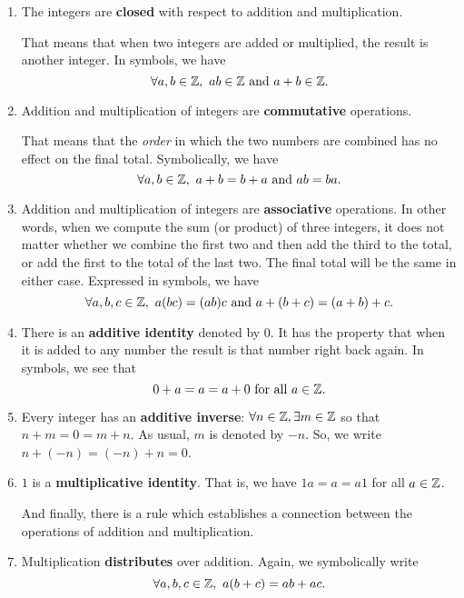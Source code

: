 \clearpage
\begin{enumerate}
 \item The integers are {\bfseries closed} with respect to addition and multiplication.
 
 That means that when two integers are added or multiplied, the result is another
 integer. In symbols, we have 
 \[
 \forall a,b\in \mathbb{Z},\ ab\in \mathbb{Z} \text{ and } a+b\in \mathbb{Z}.
 \]
 
 
 \item Addition and multiplication of integers are {\bfseries commutative} 
 operations.
 
 That means that the {\it order} in which the two numbers are combined has no
 effect on the final total. Symbolically, we have
 \[
 \forall a,b\in \mathbb{Z},\ a+b=b+a \text{ and }  ab=ba.
 \]
 
 
 \item Addition and multiplication of integers are {\bfseries associative} 
 operations.
 In other words, when we compute the sum (or product) of three integers, it does
 not matter whether we combine the first two and then add the third to the total, 
 or add the first to the total of the last two. The final total will be the same
 in either case. Expressed in symbols, we have
 \[
 \forall a,b,c\in \mathbb{Z},\ a(bc)=(ab)c \text{ and } a+(b+c)=(a+b)+c.
 \]
 
 
 \item There is an {\bfseries additive identity} denoted by $0$. 
 It has the property that when it is added to any number the result is
 that number right back again. In symbols, we see that
 \[
 0+a=a=a+0 \text{ for all } a\in \mathbb{Z}.
 \]
 
 
 \item Every integer has an {\bfseries additive inverse}: $\forall n\in \mathbb{Z}, \exists m\in \mathbb{Z}$ 
 so that $n+m=0=m+n$. As usual, $m$ is denoted by $-n$. So, we write $n+(-n)=(-n)+n = 0$.
 
 
 \item $1$ is a {\bfseries multiplicative identity}. That is, we have $1a=a=a1$ for all $a\in \mathbb{Z}$.
 
 And finally, there is a rule which establishes a connection between the operations of addition and multiplication.
 
 
\clearpage 
 \item Multiplication {\bfseries distributes} over addition. Again, we symbolically write
 \[
 \forall a,b,c\in \Z,\ a(b+c)=ab+ac.
 \]
\end{enumerate}


